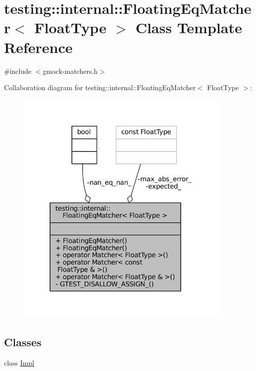 \hypertarget{classtesting_1_1internal_1_1FloatingEqMatcher}{}\section{testing\+:\+:internal\+:\+:Floating\+Eq\+Matcher$<$ Float\+Type $>$ Class Template Reference}
\label{classtesting_1_1internal_1_1FloatingEqMatcher}


{\ttfamily \#include $<$gmock-\/matchers.\+h$>$}



Collaboration diagram for testing\+:\+:internal\+:\+:Floating\+Eq\+Matcher$<$ Float\+Type $>$\+:
\nopagebreak
\begin{figure}[H]
\begin{center}
\leavevmode
\includegraphics[width=295pt]{classtesting_1_1internal_1_1FloatingEqMatcher__coll__graph}
\end{center}
\end{figure}
\subsection*{Classes}
\begin{DoxyCompactItemize}
\item 
class \hyperlink{classtesting_1_1internal_1_1FloatingEqMatcher_1_1Impl}{Impl}
\end{DoxyCompactItemize}
